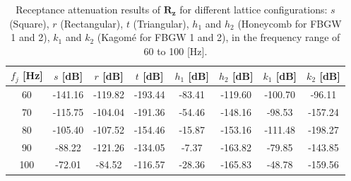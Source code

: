 \documentclass[review,numbers,sort&compress]{elsarticle}
\begin{document}
\begin{table}[htb]
    \centering
    \caption{Receptance attenuation results of $\mathbf{R_z}$ for different lattice configurations: \( s \) (Square), \( r \) (Rectangular), \( t \) (Triangular), \( h_1 \) and \( h_2 \) (Honeycomb for FBGW 1 and 2), \( k_1 \) and \( k_2 \) (Kagomé for FBGW 1 and 2), in the frequency range of 60 to 100 [Hz].}
    \begin{tabular}{cccccccc}
        $f_j$ [Hz] & $s$  [dB] & $r$  [dB] & $t$  [dB] & $h_1$ [dB] & $h_2$ [dB] & $k_1$ [dB] & $k_2$ [dB] \\ \hline
        60         & -141.16           & -119.82                 & -193.44               & -83.41                & -119.60                 & -100.70               & -96.11                \\ \hline
        70         & -115.75           & -104.04                 & -191.36               & -54.46                & -148.16                 & -98.53                & -157.24               \\ \hline
        80         & -105.40           & -107.52                 & -154.46               & -15.87                & -153.16                 & -111.48               & -198.27               \\ \hline
        90         & -88.22            & -121.26                 & -134.05               & -7.37                 & -163.82                 & -79.85                & -143.85               \\ \hline
        100        & -72.01            & -84.52                  & -116.57               & -28.36                & -165.83                 & -48.78                & -159.56               \\ \hline
    \end{tabular}
    \label{tab_tr_lattices_60_100}
\end{table}
\newpage
\end{document}

